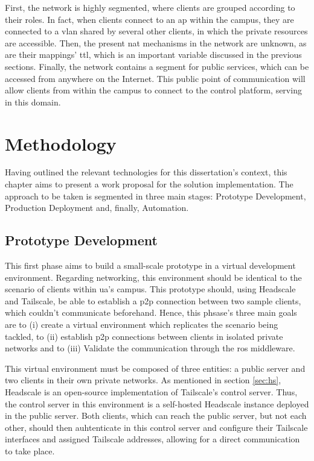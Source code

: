 \documentclass[11pt,twoside,a4paper]{report}
\begin{document}
First, the network is highly segmented, where clients are grouped according to their roles. In fact, when clients connect to an \ac{ap} within the campus, they are connected to a \ac{vlan} shared by several other clients, in which the private resources are accessible. Then, the present \ac{nat} mechanisms in the network are unknown, as are their mappings' \ac{ttl}, which is an important variable discussed in the previous sections. Finally, the network contains a segment for public services, which can be accessed from anywhere on the Internet. This public point of communication will allow clients from within the campus to connect to the control platform, serving in this domain.

\chapter{Methodology}
\label{chapter:method}


Having outlined the relevant technologies for this dissertation's context, this chapter aims to present a work proposal for the solution implementation. The approach to be taken is segmented in three main stages: Prototype Development, Production Deployment and, finally, Automation.

\section{Prototype Development}

This first phase aims to build a small-scale prototype in a virtual development environment. Regarding networking, this environment should be identical to the scenario of clients within \ac{ua}'s campus. This prototype should, using Headscale and Tailscale, be able to establish a \ac{p2p} connection between two sample clients, which couldn't communicate beforehand. Hence, this phsase's three main goals are to (i) create a virtual environment which replicates the scenario being tackled, to (ii) establish \ac{p2p} connections between clients in isolated private networks and to (iii) Validate the communication through the \ac{ros} middleware.

This virtual environment must be composed of three entities: a public server and two clients in their own private networks. As mentioned in section \ref{sec:hs}, Headscale is an open-source implementation of Tailscale's control server. Thus, the control server in this environment is a self-hosted Headscale instance deployed in the public server. Both clients, which can reach the public server, but not each other, should then auhtenticate in this control server and configure their Tailscale interfaces and assigned Tailscale addresses, allowing for a direct communication to take place.
\end{document}
